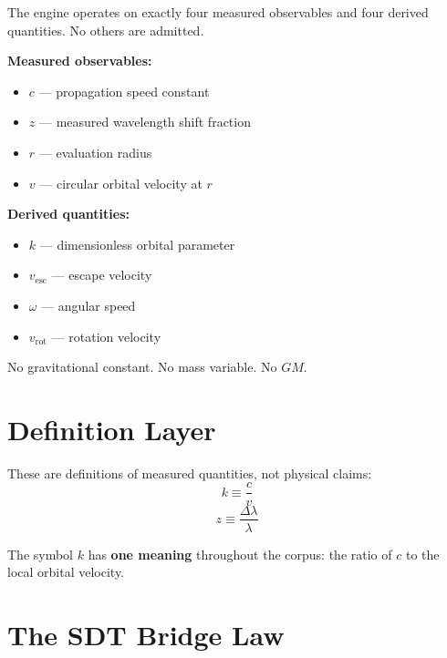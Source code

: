 The engine operates on exactly four measured observables and four derived quantities.  No others are admitted.

\textbf{Measured observables:}
\begin{itemize}
  \item $c$ --- propagation speed constant
  \item $z$ --- measured wavelength shift fraction
  \item $r$ --- evaluation radius
  \item $v$ --- circular orbital velocity at $r$
\end{itemize}

\textbf{Derived quantities:}
\begin{itemize}
  \item $k$ --- dimensionless orbital parameter
  \item $v_{\text{esc}}$ --- escape velocity
  \item $\omega$ --- angular speed
  \item $v_{\text{rot}}$ --- rotation velocity
\end{itemize}

No gravitational constant.  No mass variable.  No $GM$.


\section{Definition Layer}
\label{sec:definitions}

These are definitions of measured quantities, not physical claims:
\begin{equation}\label{eq:k-def}
  k \equiv \frac{c}{v}
\end{equation}
\begin{equation}\label{eq:z-def}
  z \equiv \frac{\Delta\lambda}{\lambda}
\end{equation}

The symbol $k$ has \textbf{one meaning} throughout the corpus: the ratio of $c$ to the local orbital velocity.


\section{The SDT Bridge Law}
\label{sec:bridge-law}

